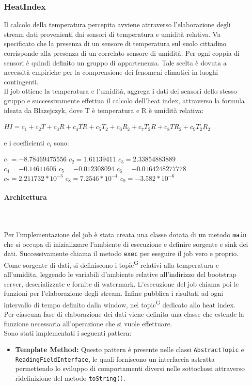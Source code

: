 \documentclass[8pt]{article}
\newcommand{\glossterm}[1]{#1\textsuperscript{G}} %
\newcommand{\subsubsubsection}[1]{\paragraph{#1}\mbox{}\\\\}
\begin{document}
\subsubsection{HeatIndex}
Il calcolo della temperatura percepita avviene attraverso l'elaborazione degli stream dati provenienti dai sensori di temperatura e umidità relativa. Va specificato che la presenza di un sensore di temperatura sul suolo cittadino corrisponde alla presenza di un correlato sensore di umidità. Per ogni coppia di sensori è quindi definito un gruppo di appartenenza. Tale scelta è dovuta a necessità empiriche per la comprensione dei fenomeni climatici in luoghi contingenti.
\\Il job ottiene la temperatura e l’umidità, aggrega i dati dei sensori dello stesso gruppo e successivamente effettua il calcolo dell'heat index, attraverso la
formula ideata da Blazejczyk, dove T è temperatura e R è umidità relativa:
\begin{center}
    $HI = c_1 + c_2T + c_3R + c_4T R + c_5T_2 + c_6R_2 + c_7T_2R + c_8TR_2 + c_9T_2R_2$
\end{center}
e i coefficienti $c_i$ sono:
\begin{center}
    $c_1 = -8.78469475556$ $c_2 = 1.61139411$ $c_3 = 2.33854883889$
    \\$c_4 = -0.14611605$ $c_5 = -0.012308094$ $c_6 = -0.0164248277778$
    \\$c_7 = 2.211732 * 10^{-3}$ $c_8 = 7.2546 * 10^{-4}$ $c_9 = -3.582 * 10^{-6}$
\end{center}
\clearpage
\subsubsubsection{Architettura}
Per l'implementazione del job è stata creata una classe dotata di un metodo \verb|main| che si occupa di inizializzare l’ambiente di esecuzione e definire sorgente e sink dei dati. Successivamente chiama il metodo \verb|exec| per eseguire il job vero e proprio. Come sorgente di dati, si definiscono i \glossterm{topic} relativi
alla temperatura e all’umidita, leggendo le variabili d’ambiente relative all’indirizzo del bootstrap server, deserializzate e fornite di watermark. L'esecuzione del job chiama poi le funzioni per l'elaborazione degli stream. Infine pubblica i risultati ad ogni intervallo di tempo definito dalla window, nel \glossterm{topic} dedicato allo heat index.
\\Per ciascuna fase di elaborazione dei dati viene definita una classe che estende la funzione necessaria all'operazione che si vuole effettuare.
\\Sono stati implementati i seguenti pattern:
\begin{itemize}
	\setlength\itemsep{0em}
    \item \textbf{Template Method:}
    Questo pattern è presente nelle classi \verb|AbstractTopic| e \verb|ReadingFieldInterface|, le quali forniscono un interfaccia astratta permettendo lo sviluppo di comportamenti diversi nelle sottoclassi attraverso ridefinizione del metodo \verb|toString()|.
\end{itemize}
\end{document}
